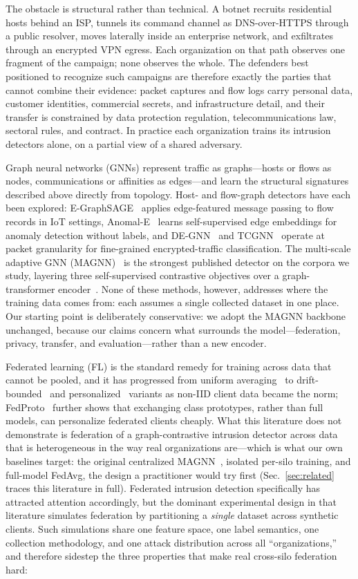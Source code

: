 \documentclass[journal]{IEEEtran}
\begin{document}
The obstacle is structural rather than technical. A botnet recruits
residential hosts behind an ISP, tunnels its command channel as
DNS-over-HTTPS through a public resolver, moves laterally inside an
enterprise network, and exfiltrates through an encrypted VPN egress.
Each organization on that path observes one fragment of the campaign;
none observes the whole. The defenders best positioned to recognize
such campaigns are therefore exactly the parties that cannot combine
their evidence: packet captures and flow logs carry personal data,
customer identities, commercial secrets, and infrastructure detail,
and their transfer is constrained by data protection regulation,
telecommunications law, sectoral rules, and contract. In practice each
organization trains its intrusion detectors alone, on a partial view
of a shared adversary.

Graph neural networks (GNNs) represent traffic as graphs---hosts or
flows as nodes, communications or affinities as edges---and learn the
structural signatures described above directly from topology. Host-
and flow-graph detectors have each been explored: E-GraphSAGE~
\cite{egraphsage} applies edge-featured message passing to flow
records in IoT settings, Anomal-E~\cite{anomale} learns self-supervised
edge embeddings for anomaly detection without labels, and DE-GNN~
\cite{degnn} and TCGNN~\cite{tcgnn} operate at packet granularity for
fine-grained encrypted-traffic classification. The multi-scale
adaptive GNN (MAGNN)~\cite{magnn} is the strongest published detector
on the corpora we study, layering three self-supervised contrastive
objectives over a graph-transformer encoder~\cite{transformerconv}.
None of these methods, however, addresses where the training data
comes from: each assumes a single collected dataset in one place. Our
starting point is deliberately conservative: we adopt the MAGNN
backbone unchanged, because our claims concern what surrounds the
model---federation, privacy, transfer, and evaluation---rather than a
new encoder.

Federated learning (FL) is the standard remedy for training across
data that cannot be pooled, and it has progressed from uniform
averaging~\cite{fedavg} to drift-bounded~\cite{fedprox} and
personalized~\cite{fedper} variants as non-IID client data became the
norm; FedProto~\cite{fedproto} further shows that exchanging class
prototypes, rather than full models, can personalize federated clients
cheaply. What this literature does not demonstrate is federation of a
graph-contrastive intrusion detector across data that is heterogeneous
in the way real organizations are---which is what our own baselines
target: the original centralized MAGNN~\cite{magnn}, isolated
per-silo training, and full-model FedAvg, the design a practitioner
would try first (Sec.~\ref{sec:related} traces this literature in
full). Federated intrusion detection specifically has attracted
attention accordingly, but the dominant experimental design in that
literature simulates federation by partitioning a \emph{single}
dataset across synthetic clients. Such simulations share one feature
space, one label semantics, one collection methodology, and one attack
distribution across all ``organizations,'' and therefore sidestep the
three properties that make real cross-silo federation hard:
\end{document}
